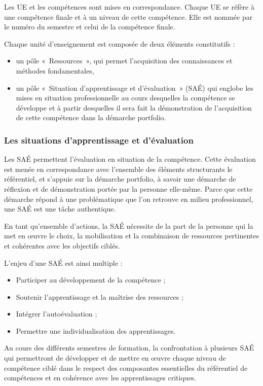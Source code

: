 \documentclass[10pt]{article}
\begin{document}
Les UE et les compétences sont mises en correspondance. Chaque UE se
réfère à une compétence finale et à un niveau de cette compétence. Elle
est nommée par le numéro du semestre et celui de la compétence finale.

Chaque unité d’enseignement est composée de deux éléments constitutifs :
\begin{itemize}
\item un pôle «~Ressources~», qui permet l’acquisition des connaissances et méthodes
fondamentales,
\item un pôle «~Situation d'apprentissage et d'évaluation~» (SAÉ) qui
  englobe les mises en situation professionnelle au cours desquelles la
  compétence se développe et à partir desquelles il sera fait la
  démonstration de l’acquisition de cette compétence dans la démarche
  portfolio.
\end{itemize}

\subsubsection{Les situations d'apprentissage et d'évaluation}
Les SAÉ permettent l'évaluation en situation de la compétence. Cette
évaluation est menée en correspondance avec l'ensemble des éléments
structurants le référentiel, et s'appuie sur la démarche portfolio, à
savoir une démarche de réflexion et de démonstration portée par la
personne elle-même.  Parce que cette démarche répond à une problématique
que l'on retrouve en milieu professionnel, une SAÉ est une tâche
authentique.

En tant qu'ensemble d'actions, la SAÉ nécessite de la part de la
personne qui la met en œuvre le choix, la mobilisation et la combinaison
de ressources pertinentes et cohérentes avec les objectifs ciblés.

L'enjeu d'une SAÉ est ainsi multiple :
\begin{itemize}
\item Participer au développement de la compétence ;
\item Soutenir l'apprentissage et la maîtrise des ressources ;
\item Intégrer l'autoévaluation ;
\item Permettre une individualisation des apprentissages.
\end{itemize}

Au cours des différents semestres de formation, la confrontation à
plusieurs SAÉ qui permettront de développer et de mettre en œuvre
chaque niveau de compétence ciblé dans le respect des composantes
essentielles du référentiel de compétences et en cohérence avec les
apprentissages critiques.
\end{document}
